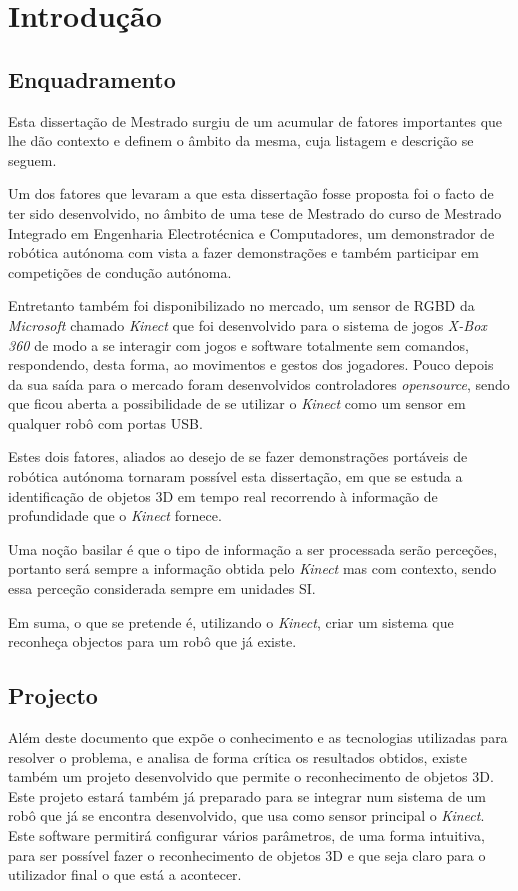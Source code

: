 \chapter{Introdução} \label{chap:intro}

\section{Enquadramento} \label{sec:context}

Esta dissertação de Mestrado surgiu de um acumular de fatores importantes que lhe dão contexto e definem o âmbito da mesma, cuja listagem e descrição se seguem.

Um dos fatores que levaram a que esta dissertação fosse proposta foi o facto de ter sido desenvolvido, no âmbito de uma tese de Mestrado do curso de Mestrado Integrado em Engenharia Electrotécnica e Computadores, um demonstrador de robótica autónoma com vista a fazer demonstrações e também participar em competições de condução autónoma. 

Entretanto também foi disponibilizado no mercado, um sensor de RGBD da \emph{Microsoft} chamado \emph{Kinect} que foi desenvolvido para o sistema de jogos \emph{X-Box 360} de modo a se interagir com jogos e software totalmente sem comandos, respondendo, desta forma, ao movimentos e gestos dos jogadores. Pouco depois da sua saída para o mercado foram desenvolvidos controladores \emph{opensource}, sendo que ficou aberta a possibilidade de se utilizar o \emph{Kinect} como um sensor em qualquer robô com portas USB.

Estes dois fatores, aliados ao desejo de se fazer demonstrações portáveis de robótica autónoma tornaram possível esta dissertação, em que se estuda a identificação de objetos 3D em tempo real recorrendo à informação de profundidade que o \emph{Kinect} fornece.

Uma noção basilar é que o tipo de informação a ser processada serão perceções, portanto será sempre a informação obtida pelo \emph{Kinect} mas com contexto, sendo essa perceção considerada sempre em unidades SI.

Em suma, o que se pretende é, utilizando o \emph{Kinect}, criar um sistema que reconheça objectos para um robô que já existe.

\section{Projecto} \label{sec:proj}

Além deste documento que expõe o conhecimento e as tecnologias utilizadas para resolver o problema, e analisa de forma crítica os resultados obtidos, existe também um projeto desenvolvido que permite o reconhecimento de objetos 3D. Este projeto estará também já preparado para se integrar num sistema de um robô que já se encontra desenvolvido, que usa como sensor principal o \emph{Kinect}. Este software permitirá configurar vários parâmetros, de uma forma intuitiva, para ser possível fazer o reconhecimento de objetos 3D e que seja claro para o utilizador final o que está a acontecer.

